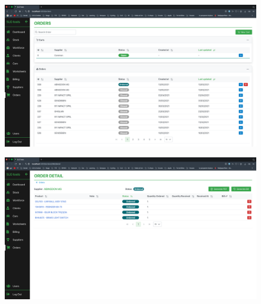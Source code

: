 \documentclass[french, 12pt, a4paper]{article}
\begin{document}
\begin{figure}
  \centering
  \includegraphics[width=\textwidth]{../img/UI/orders.png}
\end{figure}
\begin{figure}
  \centering
  \includegraphics[width=\textwidth]{../img/UI/order-detail.png}
\end{figure}
\end{document}
